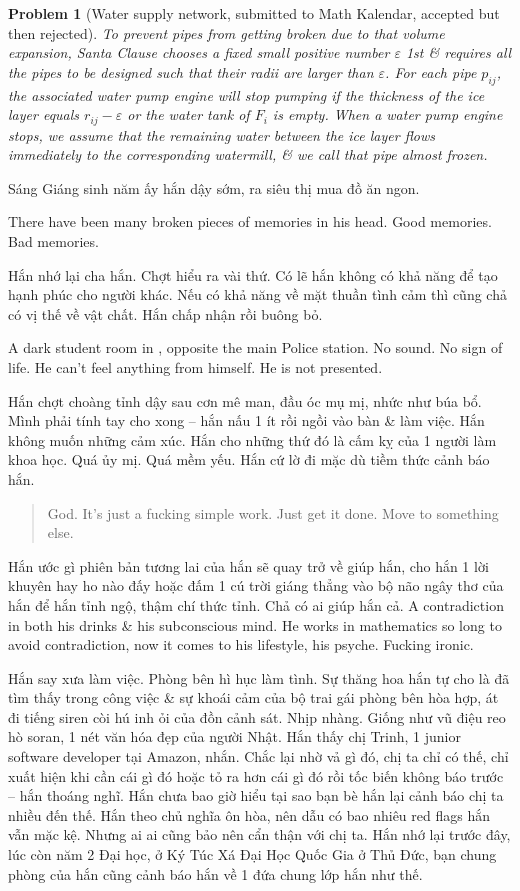 \documentclass[12pt]{article}
\newtheorem{problem}{Problem}
\begin{document}
\begin{problem}[Water supply network, submitted to Math Kalendar, accepted but then rejected]
	To prevent pipes from getting broken due to that volume expansion, Santa Clause chooses a fixed small positive number $\varepsilon$ 1st \& requires all the pipes to be designed such that their radii are larger than $\varepsilon$. For each pipe $p_{ij}$, the associated water pump engine will stop pumping if the thickness of the ice layer equals $r_{ij} - \varepsilon$ or the water tank of $F_i$ is empty. When a water pump engine stops, we assume that the remaining water between the ice layer flows immediately to the corresponding watermill, \& we call that pipe \emph{almost frozen}.
	
	
\end{problem}

Sáng Giáng sinh năm ấy hắn dậy sớm, ra siêu thị mua đồ ăn ngon. 

There have been many broken pieces of memories in his head. Good memories. Bad memories.

Hắn nhớ lại cha hắn. Chợt hiểu ra vài thứ. Có lẽ hắn không có khả năng để tạo hạnh phúc cho người khác. Nếu có khả năng về mặt thuần tình cảm thì cũng chả có vị thế về vật chất. Hắn chấp nhận rồi buông bỏ.

A dark student room in , opposite the main Police station. No sound. No sign of life. He can't feel anything from himself. He is not presented.

Hắn chợt choàng tỉnh dậy sau cơn mê man, đầu óc mụ mị, nhức như búa bổ. Mình phải tính tay cho xong -- hắn nấu 1 ít rồi ngồi vào bàn \& làm việc. Hắn không muốn những cảm xúc. Hắn cho những thứ đó là cấm kỵ của 1 người làm khoa học. Quá ủy mị. Quá mềm yếu. Hắn cứ lờ đi mặc dù tiềm thức cảnh báo hắn.

\begin{quotation}
	God. It's just a fucking simple work. Just get it done. Move to something else.
\end{quotation}
Hắn ước gì phiên bản tương lai của hắn sẽ quay trở về giúp hắn, cho hắn 1 lời khuyên hay ho nào đấy hoặc đấm 1 cú trời giáng thẳng vào bộ não ngây thơ của hắn để hắn tỉnh ngộ, thậm chí thức tỉnh. Chả có ai giúp hắn cả. A contradiction in both his drinks \& his subconscious mind. He works in mathematics so long to avoid contradiction, now it comes to his lifestyle, his psyche. Fucking ironic.

Hắn say xưa làm việc. Phòng bên hì hục làm tình. Sự thăng hoa hắn tự cho là đã tìm thấy trong công việc \& sự khoái cảm của bộ trai gái phòng bên hòa hợp, át đi tiếng siren còi hú inh ỏi của đồn cảnh sát. Nhịp nhàng. Giống như vũ điệu reo hò soran, 1 nét văn hóa đẹp của người Nhật. Hắn thấy chị Trinh, 1 junior software developer tại Amazon, nhắn. Chắc lại nhờ vả gì đó, chị ta chỉ có thế, chỉ xuất hiện khi cần cái gì đó hoặc tỏ ra hơn cái gì đó rồi tốc biến không báo trước -- hắn thoáng nghĩ. Hắn chưa bao giờ hiểu tại sao bạn bè hắn lại cảnh báo chị ta nhiều đến thế. Hắn theo chủ nghĩa ôn hòa, nên dẫu có bao nhiêu red flags hắn vẫn mặc kệ. Nhưng ai ai cũng bảo nên cẩn thận với chị ta. Hắn nhớ lại trước đây, lúc còn năm 2 Đại học, ở Ký Túc Xá Đại Học Quốc Gia ở Thủ Đức, bạn chung phòng của hắn cũng cảnh báo hắn về 1 đứa chung lớp hắn như thế.
\end{document}
